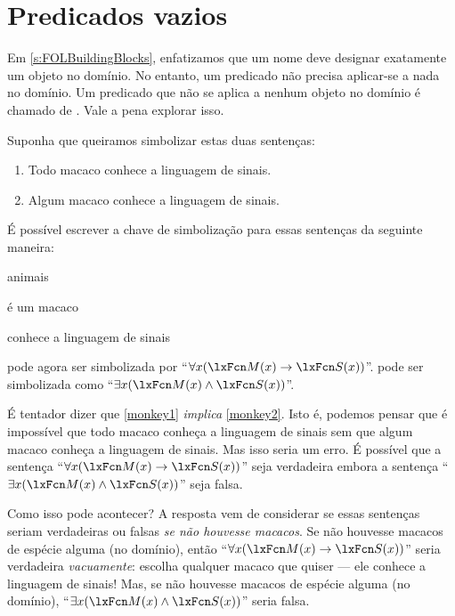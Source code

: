 \section{Predicados vazios}

Em \cref{s:FOLBuildingBlocks}, enfatizamos que um nome deve designar exatamente um objeto no domínio. No entanto, um predicado não precisa aplicar-se a nada no domínio. Um predicado que não se aplica a nenhum objeto no domínio é chamado de . Vale a pena explorar isso.


Suponha que queiramos simbolizar estas duas sentenças:
	\begin{enumerate}
\item\label{monkey1} Todo macaco conhece a linguagem de sinais.
\item\label{monkey2} Algum macaco conhece a linguagem de sinais.
	\end{enumerate}
É possível escrever a chave de simbolização para essas sentenças da seguinte maneira:
	\begin{ekey}
\item[\text{domínio}] animais
\item[\atom{M}{x}]  é um macaco
\item[\atom{S}{x}]  conhece a linguagem de sinais
	\end{ekey}
 pode agora ser simbolizada por \textquotedblleft $\forall x(\atom{M}{x} \eif \atom{S}{x})$\textquotedblright{}.  pode ser simbolizada como \textquotedblleft $\exists x(\atom{M}{x} \eand \atom{S}{x})$\textquotedblright{}.



É tentador dizer que \cref*{monkey1} \emph{implica} \cref*{monkey2}. Isto é, podemos pensar que é impossível que todo macaco conheça a linguagem de sinais sem que algum macaco conheça a linguagem de sinais. Mas isso seria um erro. É possível que a sentença \textquotedblleft $\forall x(\atom{M}{x} \eif \atom{S}{x})$\textquotedblright{} seja verdadeira embora a sentença \textquotedblleft $\exists x(\atom{M}{x} \eand \atom{S}{x})$\textquotedblright{} seja falsa.

Como isso pode acontecer? A resposta vem de considerar se essas sentenças seriam verdadeiras ou falsas \emph{se não houvesse macacos}. Se não houvesse macacos de espécie alguma (no domínio), então \textquotedblleft $\forall x(\atom{M}{x} \eif \atom{S}{x})$\textquotedblright{} seria verdadeira \emph{vacuamente}: escolha qualquer macaco que quiser — ele conhece a linguagem de sinais! Mas, se não houvesse macacos de espécie alguma (no domínio), \textquotedblleft $\exists x(\atom{M}{x} \eand \atom{S}{x})$\textquotedblright{} seria falsa.

